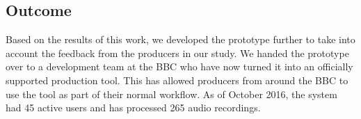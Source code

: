 




\subsection{Outcome}
Based on the results of this work, we developed the prototype further to take into account the feedback from the
producers in our study.  We handed the prototype over to a development team at the BBC who have now turned it into an
officially supported production tool.  This has allowed producers from around the BBC to use the tool as part of their
normal workflow.
As of October 2016, the system had 45 active users and has processed 265 audio recordings.



